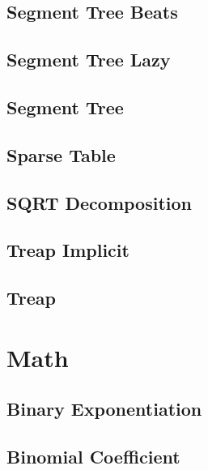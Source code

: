 \subsection{Segment Tree Beats}
\raggedbottom
\hrulefill
\subsection{Segment Tree Lazy}
\raggedbottom
\hrulefill
\subsection{Segment Tree}
\raggedbottom
\hrulefill
\subsection{Sparse Table}
\raggedbottom
\hrulefill
\subsection{SQRT Decomposition}
\raggedbottom
\hrulefill
\subsection{Treap Implicit}
\raggedbottom
\hrulefill
\subsection{Treap}
\raggedbottom
\hrulefill


\section{Math}
\subsection{Binary Exponentiation}
\raggedbottom
\hrulefill
\subsection{Binomial Coefficient}
\raggedbottom
\hrulefill
